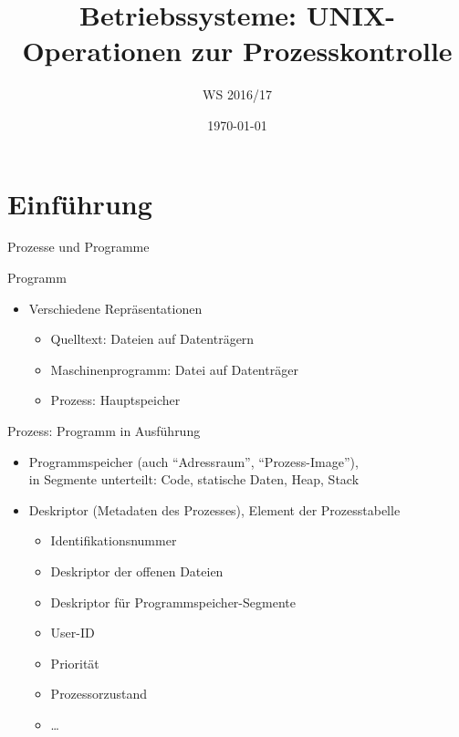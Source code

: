 \documentclass[utf8,9pt]{beamer}
\title{Betriebssysteme: UNIX-Operationen zur Prozesskontrolle}
\subtitle{WS 2016/17}
\date{\today}
\begin{document}
\frame{\titlepage}


\part{Einführung}



\begin{frame}{Prozesse und Programme}

  \begin{block}{Programm}
    \tiny\fontsize{8pt}{8pt}\selectfont

    \begin{itemize}
    \item Verschiedene Repräsentationen
      \begin{itemize}
      \item Quelltext: Dateien auf Datenträgern
      \item Maschinenprogramm: Datei auf Datenträger
      \item Prozess: Hauptspeicher
      \end{itemize}
    \end{itemize}
  \end{block}

  \begin{block}{Prozess: Programm in Ausführung}
    \tiny\fontsize{8pt}{8pt}\selectfont

    \begin{itemize}
    \item  Programmspeicher (auch "`Adressraum"', "`Prozess-Image"'),\\
      in Segmente unterteilt: Code, statische Daten, Heap, Stack
    \item Deskriptor (Metadaten des Prozesses), Element der
      Prozesstabelle
      \begin{itemize}
      \item Identifikationsnummer
      \item Deskriptor der offenen Dateien
      \item Deskriptor für Programmspeicher-Segmente
      \item User-ID
      \item Priorität
      \item Prozessorzustand
      \item \dots
      \end{itemize}
    \end{itemize}
  \end{block}
\end{frame}
\end{document}
